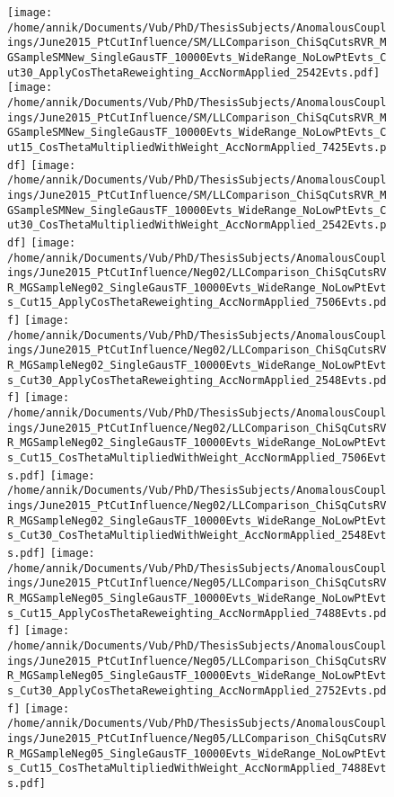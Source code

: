 \begin{figure}[h!t]
 \texttt{[image: /home/annik/Documents/Vub/PhD/ThesisSubjects/AnomalousCouplings/June2015\_PtCutInfluence/SM/LLComparison\_ChiSqCutsRVR\_MGSampleSMNew\_SingleGausTF\_10000Evts\_WideRange\_NoLowPtEvts\_Cut30\_ApplyCosThetaReweighting\_AccNormApplied\_2542Evts.pdf]}
 \texttt{[image: /home/annik/Documents/Vub/PhD/ThesisSubjects/AnomalousCouplings/June2015\_PtCutInfluence/SM/LLComparison\_ChiSqCutsRVR\_MGSampleSMNew\_SingleGausTF\_10000Evts\_WideRange\_NoLowPtEvts\_Cut15\_CosThetaMultipliedWithWeight\_AccNormApplied\_7425Evts.pdf]}
 \texttt{[image: /home/annik/Documents/Vub/PhD/ThesisSubjects/AnomalousCouplings/June2015\_PtCutInfluence/SM/LLComparison\_ChiSqCutsRVR\_MGSampleSMNew\_SingleGausTF\_10000Evts\_WideRange\_NoLowPtEvts\_Cut30\_CosThetaMultipliedWithWeight\_AccNormApplied\_2542Evts.pdf]}
 \texttt{[image: /home/annik/Documents/Vub/PhD/ThesisSubjects/AnomalousCouplings/June2015\_PtCutInfluence/Neg02/LLComparison\_ChiSqCutsRVR\_MGSampleNeg02\_SingleGausTF\_10000Evts\_WideRange\_NoLowPtEvts\_Cut15\_ApplyCosThetaReweighting\_AccNormApplied\_7506Evts.pdf]}
 \texttt{[image: /home/annik/Documents/Vub/PhD/ThesisSubjects/AnomalousCouplings/June2015\_PtCutInfluence/Neg02/LLComparison\_ChiSqCutsRVR\_MGSampleNeg02\_SingleGausTF\_10000Evts\_WideRange\_NoLowPtEvts\_Cut30\_ApplyCosThetaReweighting\_AccNormApplied\_2548Evts.pdf]}
 \texttt{[image: /home/annik/Documents/Vub/PhD/ThesisSubjects/AnomalousCouplings/June2015\_PtCutInfluence/Neg02/LLComparison\_ChiSqCutsRVR\_MGSampleNeg02\_SingleGausTF\_10000Evts\_WideRange\_NoLowPtEvts\_Cut15\_CosThetaMultipliedWithWeight\_AccNormApplied\_7506Evts.pdf]}
 \texttt{[image: /home/annik/Documents/Vub/PhD/ThesisSubjects/AnomalousCouplings/June2015\_PtCutInfluence/Neg02/LLComparison\_ChiSqCutsRVR\_MGSampleNeg02\_SingleGausTF\_10000Evts\_WideRange\_NoLowPtEvts\_Cut30\_CosThetaMultipliedWithWeight\_AccNormApplied\_2548Evts.pdf]}
 \texttt{[image: /home/annik/Documents/Vub/PhD/ThesisSubjects/AnomalousCouplings/June2015\_PtCutInfluence/Neg05/LLComparison\_ChiSqCutsRVR\_MGSampleNeg05\_SingleGausTF\_10000Evts\_WideRange\_NoLowPtEvts\_Cut15\_ApplyCosThetaReweighting\_AccNormApplied\_7488Evts.pdf]}
 \texttt{[image: /home/annik/Documents/Vub/PhD/ThesisSubjects/AnomalousCouplings/June2015\_PtCutInfluence/Neg05/LLComparison\_ChiSqCutsRVR\_MGSampleNeg05\_SingleGausTF\_10000Evts\_WideRange\_NoLowPtEvts\_Cut30\_ApplyCosThetaReweighting\_AccNormApplied\_2752Evts.pdf]}
 \texttt{[image: /home/annik/Documents/Vub/PhD/ThesisSubjects/AnomalousCouplings/June2015\_PtCutInfluence/Neg05/LLComparison\_ChiSqCutsRVR\_MGSampleNeg05\_SingleGausTF\_10000Evts\_WideRange\_NoLowPtEvts\_Cut15\_CosThetaMultipliedWithWeight\_AccNormApplied\_7488Evts.pdf]}

\end{figure}
